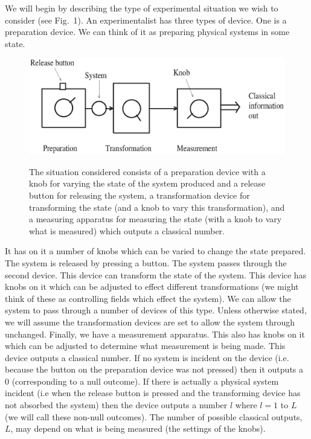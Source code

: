 \documentclass[12pt]{article}
\begin{document}
We will begin by describing the type of experimental situation we wish
to consider (see Fig.~1).  An experimentalist has three types of device.
One is a preparation device.  We can think of it as preparing physical
systems in some state.
\begin{figure}[t]
\resizebox{\textwidth}{!}
{\includegraphics{qaxiomf1.eps}}
\caption{The situation considered consists of a preparation device with
a knob for varying the state of the system produced and a release button
for releasing the system, a transformation device for transforming the
state (and a knob to vary this transformation), and a measuring
apparatus for measuring the state (with a knob to vary what is measured)
which outputs a classical number.}
\end{figure}
It has on it a number of knobs which can be
varied to change the state prepared.  The system is released by
pressing a button. The system passes through the second device.
This device can transform the
state of the system.  This device has knobs on it which can be
adjusted to effect different transformations (we might think of these as
controlling fields which effect the system). We can allow the system
to pass through a number of devices of this type.  Unless otherwise
stated, we will assume the transformation devices are set to allow the
system through unchanged.
Finally, we have a
measurement apparatus. This also has knobs on it which can be adjusted
to determine what measurement is being made.  This device outputs a
classical number.  If no system is incident on the device (i.e.
because the button on the preparation device was not pressed)
then it outputs a 0 (corresponding to a null outcome). If there is
actually a physical system incident (i.e when the release button is
pressed and the transforming device has not absorbed the system)
then the device outputs a number $l$
where $l=1$ to $L$ (we will call these  non-null outcomes).
The number of possible classical
outputs, $L$, may depend on what is being measured (the settings of the
knobs).
\end{document}
